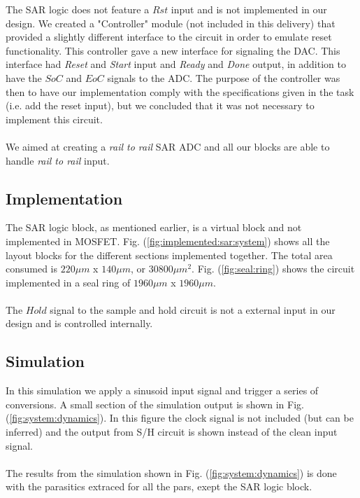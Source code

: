 \documentclass[english, 12pt, a4paper]{ifimaster}
\begin{document}
The SAR logic does not feature a \(Rst\) input and is not implemented in our design. 
We created a "Controller" module (not included in this delivery) that provided a slightly different interface to the circuit in order to emulate reset functionality.
This controller gave a new interface for signaling the DAC.
This interface had \textit{Reset} and \textit{Start} input and \textit{Ready} and \textit{Done} output, in addition to have the \(SoC\) and \(EoC\) signals to the ADC.
The purpose of the controller was then to have our implementation comply with the specifications given in the task (i.e. add the reset input), but we concluded that it 
was not necessary to implement this circuit.\\
\\
We aimed at creating a \textit{rail to rail} SAR ADC and all our blocks are able to handle \textit{rail to rail} input.

\subsection{Implementation}
The SAR logic block, as mentioned earlier, is a virtual block and not implemented in MOSFET. 
Fig. (\ref{fig:implemented:sar:system}) shows all the layout blocks for the different sections
implemented together. The total area consumed is \(220 \mu m \) x \(140 \mu m\), or \(30 800 \mu m^2\). 
Fig. (\ref{fig:seal:ring}) shows the circuit implemented in a seal ring of \(1960 \mu m\) x 
\(1960 \mu m\). \\
\\
The \(Hold\) signal to the sample and hold circuit is not a external 
input in our design and is controlled internally. 

% 


\subsection{Simulation}
In this simulation we apply a sinusoid input signal and trigger a series of conversions. A small section of the simulation output is shown in Fig. (\ref{fig:system:dynamics}). 
In this figure the clock signal is not included (but can be inferred) and the output from S/H circuit is shown instead of the clean input signal.\\
\\
The results from the simulation shown in Fig. (\ref{fig:system:dynamics}) is done with the parasitics extraced for all the pars, exept the SAR logic block. 
 
\end{document}
